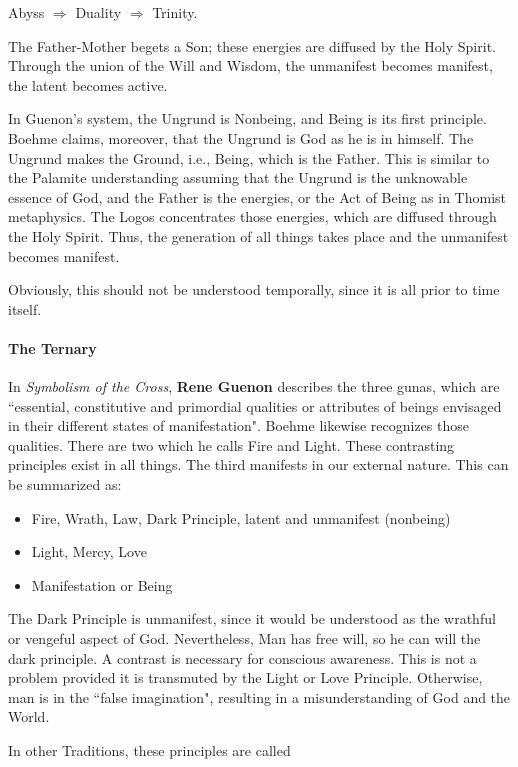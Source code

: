 Abyss $\Rightarrow $ Duality $\Rightarrow $ Trinity.

The Father-Mother begets a Son; these energies are diffused by the Holy Spirit. Through the union of the Will and Wisdom, the unmanifest becomes manifest, the latent becomes active.

In Guenon's system, the Ungrund is Nonbeing, and Being is its first principle. Boehme claims, moreover, that the Ungrund is God as he is in himself. The Ungrund makes the Ground, i.e., Being, which is the Father. This is similar to the Palamite understanding assuming that the Ungrund is the unknowable essence of God, and the Father is the energies, or the Act of Being as in Thomist metaphysics. The Logos concentrates those energies, which are diffused through the Holy Spirit. Thus, the generation of all things takes place and the unmanifest becomes manifest.

Obviously, this should not be understood temporally, since it is all prior to time itself.

\paragraph{The Ternary}
In \emph{Symbolism of the Cross}, \textbf{Rene Guenon} describes the three gunas, which are ``essential, constitutive and primordial qualities or attributes of beings envisaged in their different states of manifestation". Boehme likewise recognizes those qualities. There are two which he calls Fire and Light. These contrasting principles exist in all things. The third manifests in our external nature. This can be summarized as:

\begin{itemize}
\item Fire, Wrath, Law, Dark Principle, latent and unmanifest (nonbeing) 
\item Light, Mercy, Love 
\item Manifestation or Being 
\end{itemize}
The Dark Principle is unmanifest, since it would be understood as the wrathful or vengeful aspect of God. Nevertheless, Man has free will, so he can will the dark principle. A contrast is necessary for conscious awareness. This is not a problem provided it is transmuted by the Light or Love Principle. Otherwise, man is in the ``false imagination", resulting in a misunderstanding of God and the World.

In other Traditions, these principles are called

